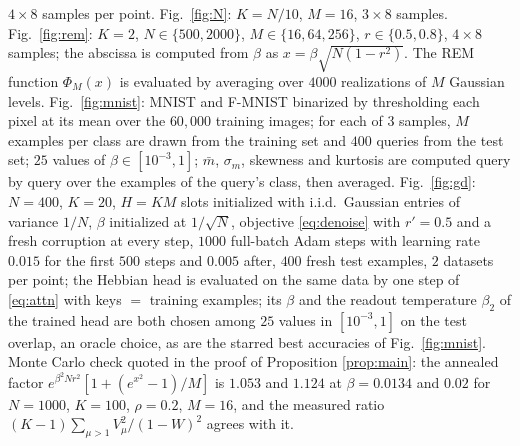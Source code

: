 \documentclass[11pt,a4paper]{article}
\begin{document}
$4\times8$ samples per point. Fig.\ \ref{fig:N}: $K=N/10$, $M=16$, $3\times8$ samples. Fig.\ \ref{fig:rem}: $K=2$, $N\in\{500,2000\}$, $M\in\{16,64,256\}$, $r\in\{0.5,0.8\}$, $4\times8$ samples; the abscissa is computed from $\beta$ as $x=\beta\sqrt{N(1-r^2)}$. The REM function $\Phi_M(x)$ is evaluated by averaging over $4000$ realizations of $M$ Gaussian levels. Fig.\ \ref{fig:mnist}: MNIST and F-MNIST binarized by thresholding each pixel at its mean over the $60{,}000$ training images; for each of $3$ samples, $M$ examples per class are drawn from the training set and $400$ queries from the test set; $25$ values of $\beta\in[10^{-3},1]$; $\bar m$, $\sigma_m$, skewness and kurtosis are computed query by query over the examples of the query's class, then averaged. Fig.\ \ref{fig:gd}: $N=400$, $K=20$, $H=KM$ slots initialized with i.i.d.\ Gaussian entries of variance $1/N$, $\beta$ initialized at $1/\sqrt N$, objective \eqref{eq:denoise} with $r'=0.5$ and a fresh corruption at every step, $1000$ full-batch Adam steps with learning rate $0.015$ for the first $500$ steps and $0.005$ after, $400$ fresh test examples, $2$ datasets per point; the Hebbian head is evaluated on the same data by one step of \eqref{eq:attn} with keys $=$ training examples; its $\beta$ and the readout temperature $\beta_2$ of the trained head are both chosen among $25$ values in $[10^{-3},1]$ on the test overlap, an oracle choice, as are the starred best accuracies of Fig.\ \ref{fig:mnist}. Monte Carlo check quoted in the proof of Proposition \ref{prop:main}: the annealed factor $e^{\beta^2Nr^2}[1+(e^{x^2}-1)/M]$ is $1.053$ and $1.124$ at $\beta=0.0134$ and $0.02$ for $N=1000$, $K=100$, $\rho=0.2$, $M=16$, and the measured ratio $(K-1)\sum_{\mu>1}V_\mu^2/(1-W)^2$ agrees with it.
\end{document}
